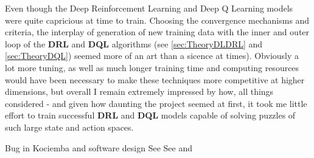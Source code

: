 Even though the Deep Reinforcement Learning and Deep Q Learning models were quite capricious at time to train. Choosing the convergence mechanisms and criteria, the interplay of generation of new training data with the inner and outer loop of the \textbf{DRL} and \textbf{DQL} algorithms (see \ref{sec:TheoryDLDRL} and \ref{sec:TheoryDQL}) seemed more of an art than a sicence at times). Obviously a lot more tuning, as well as much longer training time and computing resources would have been necessary to make these techniques more competitive at higher dimensions, but overall I remain extremely impressed by how, all things considered - and given how daunting the project seemed at first, it took me little effort to train successful \textbf{DRL} and \textbf{DQL} models capable of solving puzzles of such large state and action spaces.

Bug in Kociemba and software design
See \cite{ManyWorlds}
See \cite{https://doi.org/10.1111/1758-5899.12718} and \cite{Bostrom2014}
